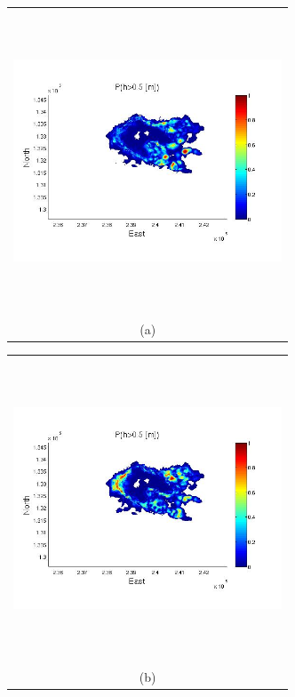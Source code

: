 \documentclass[12pt]{article}
\newcommand{\Pic}[2][0.85]{\begin{center}\texttt{[image: \#2]}
 \end{center} }
\begin{document}
\begin{figure}[H]
      \begin{minipage}[b]{0.6\textwidth}
        \begin{tabular}{c}
       \includegraphics[width=8cm,height=9cm,keepaspectratio]{Galeras0_minus_Aster30.jpg}\\
        (a)
        \end{tabular}
    \end{minipage}
    \begin{minipage}{0.6\textwidth}
        \begin{tabular}{c}
	\includegraphics[width=8cm,height=9cm,keepaspectratio]{Galeras3_minus_Aster30.jpg}\\
        (b)

\end{tabular}
\end{minipage}
\end{figure}
\end{document}
